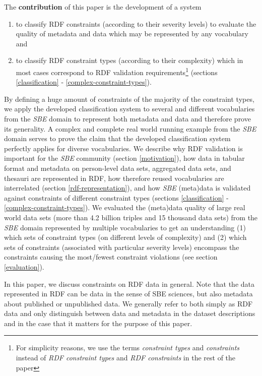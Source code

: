 \documentclass{llncs}
\newcommand{\tb}[1]{\todo[size=\small, color=green!40]{\textbf{Thomas:} #1}}
\begin{document}
The \textbf{contribution} of this paper is the development of a system 
\begin{enumerate}
	\item to classify RDF constraints (according to their severity levels) to evaluate the quality of metadata and data which may be represented by any vocabulary and 
	\item to classify RDF constraint types (according to their complexity) which in most cases correspond to RDF validation requirements\footnote{For simplicity reasons, we use the terms \emph{constraint types} and \emph{constraints} instead of \emph{RDF constraint types} and \emph{RDF constraints} in the rest of the paper} (sections \ref{classification} - \ref{complex-constraint-types}).
\end{enumerate}
By defining a huge amount of constraints of the majority of the constraint types,   
we apply the developed classification system to several and different vocabularies from the \emph{SBE} domain to represent both metadata and data and therefore prove its generality.
A complex and complete real world running example from the \emph{SBE} domain serves to prove the claim that the developed classification system perfectly applies for diverse vocabularies.
We describe why RDF validation is important for the \emph{SBE} community (section \ref{motivation}), 
how data in tabular format and metadata on person-level data sets, aggregated data sets, and thesauri are represented in RDF, 
how therefore reused vocabularies are interrelated (section \ref{rdf-representation}),
and how \emph{SBE} (meta)data is validated against constraints of different constraint types (sections \ref{classification} - \ref{complex-constraint-types}).
We evaluated the (meta)data quality of large real world data sets (more than 4.2 billion triples and 15 thousand data sets) from the \emph{SBE} domain represented by multiple vocabularies to get an understanding 
(1) which sets of constraint types (on different levels of complexity) and 
(2) which sets of constraints (associated with particular severity levels) encompass the constraints causing the most/fewest constraint violations (see section \ref{evaluation}).

In this paper, we discuss constraints on RDF data in general. Note that the data represented in RDF can be data in the sense of SBE sciences, but also metadata about published or unpublished data. We generally refer to both simply as RDF data and only distinguish between data and metadata in the dataset descriptions and in the case that it matters for the purpose of this paper.\tb{hab ich eingefügt, ist der absatz von dir...}
\end{document}
